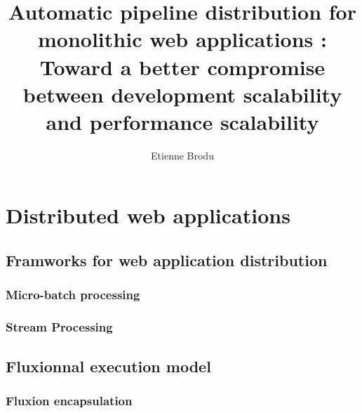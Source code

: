 \documentclass[12pt]{report}
\begin{document}
\title{Automatic pipeline distribution for monolithic web applications : Toward a better compromise between development scalability and performance scalability }
\author{Etienne Brodu}

\maketitle



\tableofcontents




% 



\chapter{Distributed web applications}

  \section{Framworks for web application distribution }
    \subsection{Micro-batch processing}
    \subsection{Stream Processing}

  \section{Fluxionnal execution model }
    \subsection{Fluxion encapsulation}
\end{document}

